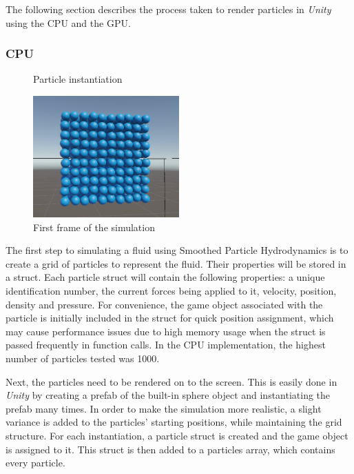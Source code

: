 \documentclass[12pt]{article}
\newcommand{\wideimage}[2][]{%
  \makebox[\textwidth][c]{\texttt{[image: \#2]}}%
}
\begin{document}
    The following section describes the process taken to render particles in \textit{Unity} using the CPU and the GPU.

    \subsubsection{CPU}

    \begin{figure}[H]
        \wideimage[width=1.1\textwidth]{spawnParticles.png}
        \caption{Particle instantiation}
    \end{figure}

    \begin{figure}[H]
        \begin{center}
            \includegraphics[width=0.5\textwidth]{firstFrameCPU.png}
            \caption{First frame of the simulation}
        \end{center}
    \end{figure}

    The first step to simulating a fluid using Smoothed Particle Hydrodynamics is to create a grid of particles to represent the fluid. Their properties will be stored in a struct. Each particle struct will contain the following properties: a unique identification number, the current forces being applied to it, velocity, position, density and pressure. For convenience, the game object associated with the particle is initially included in the struct for quick position assignment, which may cause performance issues due to high memory usage when the struct is passed frequently in function calls. In the CPU implementation, the highest number of particles tested was 1000.
    
    Next, the particles need to be rendered on to the screen. This is easily done in \textit{Unity} by creating a prefab of the built-in sphere object and instantiating the prefab many times. In order to make the simulation more realistic, a slight variance is added to the particles' starting positions, while maintaining the grid structure. For each instantiation, a particle struct is created and the game object is assigned to it. This struct is then added to a particles array, which contains every particle.
\end{document}
